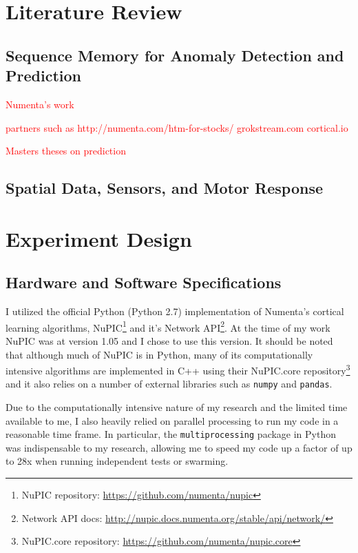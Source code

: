\documentclass[oneside,12pt,openany]{book}
\begin{document}
	\chapter{Literature Review}
	
	\section{Sequence Memory for Anomaly Detection and Prediction}
	
	\textcolor{red}{Numenta's work}
	
	\textcolor{red}{partners such as http://numenta.com/htm-for-stocks/ grokstream.com cortical.io}
	
	\textcolor{red}{Masters theses on prediction}
	
	\section{Spatial Data, Sensors, and Motor Response}
	
	\chapter{Experiment Design}
	
	\section{Hardware and Software Specifications}
	
	I utilized the official Python (Python 2.7) implementation of Numenta's cortical learning algorithms, NuPIC\footnote{NuPIC repository: \href{https://github.com/numenta/nupic}{\ttfamily https://github.com/numenta/nupic} } and it's Network API\footnote{Network API docs: \href{http://nupic.docs.numenta.org/stable/api/network/}{\ttfamily http://nupic.docs.numenta.org/stable/api/network/}}. At the time of my work NuPIC was at version 1.05 and I chose to use this version. It should be noted that although much of NuPIC is in Python, many of its computationally intensive algorithms are implemented in C++ using their NuPIC.core repository\footnote{NuPIC.core repository: \href{https://github.com/numenta/nupic.core}{\ttfamily https://github.com/numenta/nupic.core}} and it also relies on a number of external libraries such as \texttt{numpy} and \texttt{pandas}. 
	
	Due to the computationally intensive nature of my research and the limited time available to me, I also heavily relied on parallel processing to run my code in a reasonable time frame. In particular, the \texttt{multiprocessing} package in Python was indispensable to my research, allowing me to speed my code up a factor of up to 28x when running independent tests or swarming.
	
\end{document}
